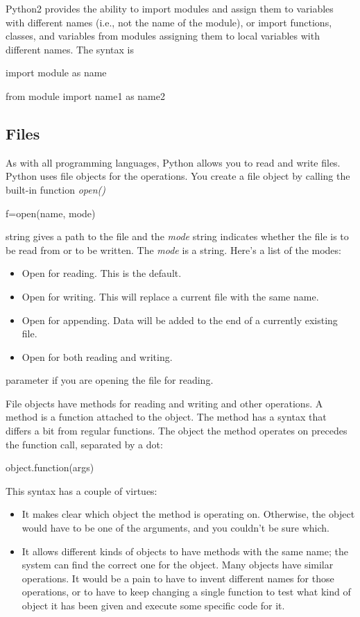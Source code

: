 Python2 provides the ability to
import modules and assign them to variables with different names (i.e.,
not the name of the module), or import functions, classes, and variables
from modules assigning them to local variables with different names. The
syntax is

import module as name

from module import name1 as name2

\subsection{Files}

As with all programming languages,
Python allows you to read and write files. Python uses file objects for
the operations. You create a file object by calling the built-in
function \emph{open()}

f=open(name, mode)

 string gives
a path to the file and the \emph{mode} string indicates whether the file
is to be read from or to be written. The \emph{mode} is a string. Here's
a list of the modes:

\begin{itemize}
\tightlist
\item
   Open for reading.
  This is the default.
\item
   Open for writing.
  This will replace a current file with the same name.
\item
   Open for appending.
  Data will be added to the end of a currently existing file.
\item
   Open for both
  reading and writing.
\end{itemize}


parameter if you are opening the file for reading.

File objects have methods for
reading and writing and other operations. A method is a function
attached to the object. The method has a syntax that differs a bit from
regular functions. The object the method operates on precedes the
function call, separated by a dot:

object.function(args)

This syntax has a couple of
virtues:

\begin{itemize}
\tightlist
\item
  It makes clear which object the
  method is operating on. Otherwise, the object would have to be one of
  the arguments, and you couldn't be sure which.
\item
  It allows different kinds of
  objects to have methods with the same name; the system can find the
  correct one for the object. Many objects have similar operations. It
  would be a pain to have to invent different names for those
  operations, or to have to keep changing a single function to test what
  kind of object it has been given and execute some specific code for
  it.
\end{itemize}

